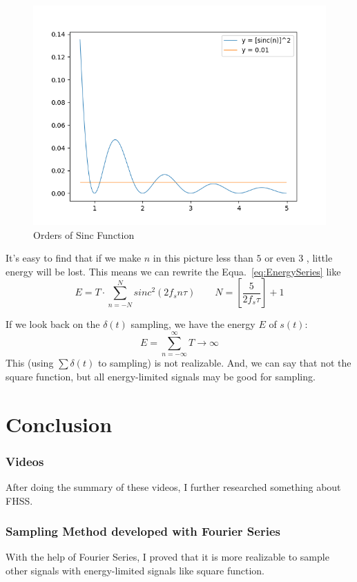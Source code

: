 \documentclass{article}
\begin{document}
\begin{figure}[!h]
    \centering
    \includegraphics[width=3 in]{../pic/sincAndLine.png}
    \caption{Orders of Sinc Function}
    \label{fig:sincAndLine}
\end{figure}
It's easy to find that if we make $n$ in this picture less than $5$ or even $3$ , little energy will be lost. This means we can rewrite the Equa.~\ref{eq:EnergySeries} like
\begin{equation}
E = T \cdot \sum_{n = -N}^{N} sinc^2(2f_sn\tau) \qquad N = [\frac{5}{2f_s \tau}] + 1
\label{eq:improvedEnergy}
\end{equation}

If we look back on the $\delta(t)$ sampling, we have the energy $E$ of $s(t)$:
\begin{equation}
E = \sum_{n = -\infty}^{\infty} T \to \infty
\label{eq:impulseEnergy}
\end{equation}
This (using $\sum \delta(t)$ to sampling) is not realizable. And, we can say that not the square function, but all energy-limited signals may be good for sampling.

\section{Conclusion}
    \subsubsection*{Videos}
        After doing the summary of these videos, I further researched something about FHSS.
    \subsubsection*{Sampling Method developed with Fourier Series}
        With the help of Fourier Series, I proved that it is more realizable to sample other signals with energy-limited signals like square function.


\end{document}
